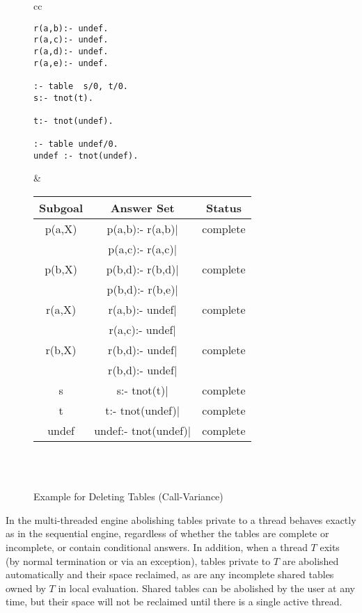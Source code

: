 \begin{description}
\begin{figure}[htb]
\begin{center}
\begin{tabular}{cc}
\begin{minipage}{14.5em}
\begin{verbatim}
r(a,b):- undef.
r(a,c):- undef.
r(a,d):- undef.
r(a,e):- undef.

:- table  s/0, t/0.
s:- tnot(t).

t:- tnot(undef).

:- table undef/0.
undef :- tnot(undef).
\end{verbatim}
\end{minipage}
&
\begin{tabular}{|c|c|c|} \hline
  Subgoal & Answer Set & Status\\ \hline \hline
  p(a,X)  & p(a,b):- r(a,b)$|$ & complete \\ 
          & p(a,c):- r(a,c)$|$ & \\ \hline
  p(b,X)  & p(b,d):- r(b,d)$|$ & complete \\ 
          & p(b,d):- r(b,e)$|$ & \\ \hline \hline
  r(a,X)  & r(a,b):- undef$|$  & complete \\ 
          & r(a,c):- undef$|$  & \\ \hline
  r(b,X)  & r(b,d):- undef$|$  & complete \\ 
          & r(b,d):- undef$|$  & \\ \hline \hline
  s       & s:- tnot(t)$|$     & complete \\ \hline \hline
  t       & t:- tnot(undef)$|$ & complete \\ \hline \hline
  undef   & undef:- tnot(undef)$|$ & complete \\ \hline \hline
\end{tabular} \\
\vspace*{-2ex} \\ \hline \hline
\end{tabular}
\end{center}
\caption{Example for Deleting Tables (Call-Variance)} \label{ex:deletion}
\end{figure}


In the multi-threaded engine abolishing tables private to a thread
behaves exactly as in the sequential engine, regardless of whether the
tables are complete or incomplete, or contain conditional answers.  In
addition, when a thread $T$ exits (by normal termination or via an
exception), tables private to $T$ are abolished automatically and
their space reclaimed, as are any incomplete shared tables owned by
$T$ in local evaluation.  Shared tables can be abolished by the user
at any time, but their space will not be reclaimed until there is a
single active thread.


\end{description}
